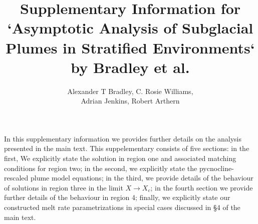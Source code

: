 \documentclass{article}
\title{Supplementary Information for `Asymptotic Analysis of Subglacial Plumes in Stratified Environments` by Bradley et al.}
\author{Alexander T Bradley, C. Rosie Williams, \\ Adrian Jenkins, Robert Arthern}
\date{}
\begin{document}
\maketitle
\newcommand{\Pb}{\textit{P}_B}  %
\newcommand{\lt}{\delta} %
\newcommand{\Pt}{\textit{P}_T}
\renewcommand{\in}{\text{in}} %
\newcommand{\out}{\text{out}}
\newcommand{\order}[1]{\mathcal{O}(#1)}
 \newcommand{\dd}[2]{\frac{\mathrm{d} #1}{\mathrm{d} #2}}
 \newcommand{\epsone}{\epsilon_1}

In this supplementary information we provides further details on the analysis presented in the main text. This suppelementary consists of five sections: in the first, We explicitly state the solution in region one and associated matching conditions for region two; in the second, we explicitly state the pycnocline-rescaled plume model equations; in the third, we provide details of the behaviour of solutions in region three in the limit $X \to X_c$; in the fourth section we provide further details of the behaviour in region 4; finally, we explicitly state our constructed melt rate parametrizations in special cases discussed in \S4 of the main text.
\end{document}
